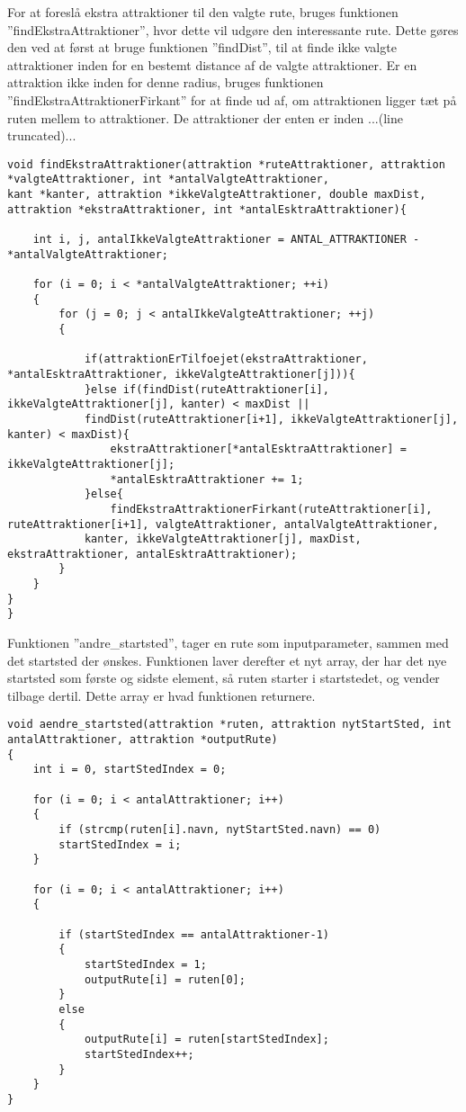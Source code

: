 For at foreslå ekstra attraktioner til den valgte rute, bruges funktionen ”findEkstraAttraktioner”, hvor dette vil udgøre den interessante rute. Dette gøres den ved at først at bruge funktionen ”findDist”, til at finde ikke valgte attraktioner inden for en bestemt distance af de valgte attraktioner. Er en attraktion ikke inden for denne radius, bruges funktionen ”findEkstraAttraktionerFirkant” for at finde ud af, om attraktionen ligger tæt på ruten mellem to attraktioner. De attraktioner der enten er inden ...(line truncated)...

\begin{lstlisting}
void findEkstraAttraktioner(attraktion *ruteAttraktioner, attraktion *valgteAttraktioner, int *antalValgteAttraktioner, 
kant *kanter, attraktion *ikkeValgteAttraktioner, double maxDist, attraktion *ekstraAttraktioner, int *antalEsktraAttraktioner){
	
	int i, j, antalIkkeValgteAttraktioner = ANTAL_ATTRAKTIONER - *antalValgteAttraktioner;
	
	for (i = 0; i < *antalValgteAttraktioner; ++i)
	{
		for (j = 0; j < antalIkkeValgteAttraktioner; ++j)
		{
			
			if(attraktionErTilfoejet(ekstraAttraktioner, *antalEsktraAttraktioner, ikkeValgteAttraktioner[j])){
			}else if(findDist(ruteAttraktioner[i], ikkeValgteAttraktioner[j], kanter) < maxDist || 
			findDist(ruteAttraktioner[i+1], ikkeValgteAttraktioner[j], kanter) < maxDist){
				ekstraAttraktioner[*antalEsktraAttraktioner] = ikkeValgteAttraktioner[j];
				*antalEsktraAttraktioner += 1;
			}else{
				findEkstraAttraktionerFirkant(ruteAttraktioner[i], ruteAttraktioner[i+1], valgteAttraktioner, antalValgteAttraktioner,
			kanter, ikkeValgteAttraktioner[j], maxDist, ekstraAttraktioner, antalEsktraAttraktioner);
		}
	}
}
}
\end{lstlisting}

Funktionen ”andre\_startsted”, tager en rute som inputparameter, sammen med det startsted der ønskes. Funktionen laver derefter et nyt array, der har det nye startsted som første og sidste element, så ruten starter i startstedet, og vender tilbage dertil. Dette array er hvad funktionen returnere.

 

\begin{lstlisting}
void aendre_startsted(attraktion *ruten, attraktion nytStartSted, int antalAttraktioner, attraktion *outputRute)
{
	int i = 0, startStedIndex = 0;
	
	for (i = 0; i < antalAttraktioner; i++)
	{
		if (strcmp(ruten[i].navn, nytStartSted.navn) == 0)
		startStedIndex = i;
	}
	
	for (i = 0; i < antalAttraktioner; i++)
	{
		
		if (startStedIndex == antalAttraktioner-1)
		{
			startStedIndex = 1;
			outputRute[i] = ruten[0];
		}
		else
		{
			outputRute[i] = ruten[startStedIndex];
			startStedIndex++;
		}
	}
}
\end{lstlisting}

